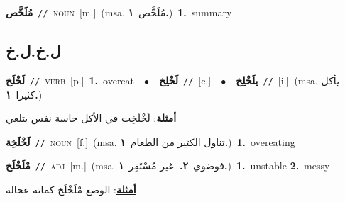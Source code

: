 \documentclass[10pt,a4paper,twoside]{article} %
\begin{document}
\begin{multicols}{2}
{\setlength\topsep{0pt}\textbf{\foreignlanguage{arabic}{مُلَخَّص}}\ {\color{gray}\texttt{//}\color{black}}\ \textsc{noun}\ [m.]\ \color{gray}(msa. \foreignlanguage{arabic}{مُلَخَّص}~\foreignlanguage{arabic}{\textbf{١.}})\color{black}\ \textbf{1.}~summary\ } \vspace{2mm}

\vspace{-3mm}
\subsection*{\color{blue}\foreignlanguage{arabic}{ل.خ.ل.خ}\color{blue}{}} 

{\setlength\topsep{0pt}\textbf{\foreignlanguage{arabic}{لَخْلَخ}}\ {\color{gray}\texttt{//}\color{black}}\ \textsc{verb}\ [p.]\ \textbf{1.}~overeat\ \ $\bullet$\ \ \setlength\topsep{0pt}\textbf{\foreignlanguage{arabic}{لَخْلِخ}}\ {\color{gray}\texttt{//}\color{black}}\ [c.]\ \ $\bullet$\ \ \setlength\topsep{0pt}\textbf{\foreignlanguage{arabic}{يلَخْلِخ}}\ {\color{gray}\texttt{//}\color{black}}\ [i.]\ \color{gray}(msa. \foreignlanguage{arabic}{يأكل كثيرا}~\foreignlanguage{arabic}{\textbf{١.}})\color{black}\  \begin{flushright}\color{gray}\foreignlanguage{arabic}{\textbf{\underline{\foreignlanguage{arabic}{أمثلة}}}: لَخْلَخِت في الأكل حاسة نفس بتلعي}\end{flushright}\color{black}} \vspace{2mm}

{\setlength\topsep{0pt}\textbf{\foreignlanguage{arabic}{لَخْلَخِة}}\ {\color{gray}\texttt{//}\color{black}}\ \textsc{noun}\ [f.]\ \color{gray}(msa. \foreignlanguage{arabic}{تناول الكثير من الطعام}~\foreignlanguage{arabic}{\textbf{١.}})\color{black}\ \textbf{1.}~overeating\ } \vspace{2mm}

{\setlength\topsep{0pt}\textbf{\foreignlanguage{arabic}{مْلَخْلَخ}}\ {\color{gray}\texttt{//}\color{black}}\ \textsc{adj}\ [m.]\ \color{gray}(msa. \foreignlanguage{arabic}{فوضوي}~\foreignlanguage{arabic}{\textbf{٢.}}  .\foreignlanguage{arabic}{غير مُسْتَقِر}~\foreignlanguage{arabic}{\textbf{١.}})\color{black}\ \textbf{1.}~unstable  \textbf{2.}~messy\  \begin{flushright}\color{gray}\foreignlanguage{arabic}{\textbf{\underline{\foreignlanguage{arabic}{أمثلة}}}: الوضع مْلَخْلَخ كماته عحاله}\end{flushright}\color{black}} \vspace{2mm}


\end{multicols}
\end{document}
